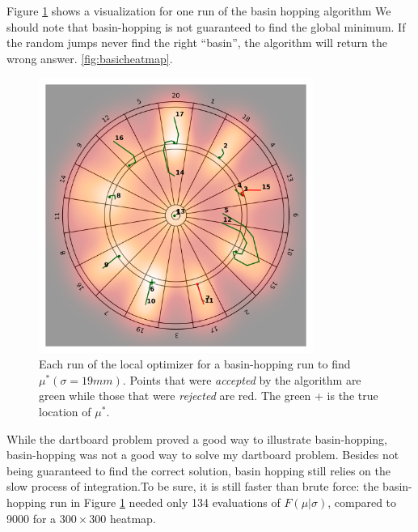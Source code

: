 \documentclass[]{article}
\newcommand{\mustar}{\ensuremath{\mu^* }}
\begin{document}
Figure \ref{fig:basin} shows a visualization for one run of the basin hopping algorithm
We should note that basin-hopping is not guaranteed to find the global minimum. If the random jumps never find the right ``basin'', the algorithm will return the wrong answer.
 \ref{fig:basicheatmap}.
\begin{figure}[h!]
	\centering
	\includegraphics[width=0.8\textwidth]{../images/sig19basin.png}
	\caption{Each run of the local optimizer for a basin-hopping run to find $\mustar(\sigma=19mm)$.  Points that were \textit{accepted} by the algorithm are green while those that were \textit{rejected} are red. The green + is the true location of \mustar.}
	\label{fig:basin}
\end{figure}

While the dartboard problem proved a good way to illustrate basin-hopping, basin-hopping was not a good way to solve my dartboard problem. Besides not being guaranteed to find the correct solution, basin hopping still relies on the slow process of integration.To be sure, it is still faster than brute force: the basin-hopping run in Figure \ref{fig:basin} needed only 134 evaluations of $F(\mu \vert \sigma)$, compared to 9000 for a $300 \times 300$ heatmap. 
\end{document}

